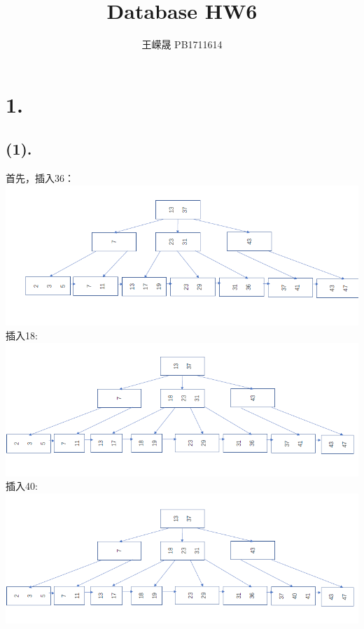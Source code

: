 \documentclass{article}
\title{Database HW6}
\author{王嵘晟 \quad PB1711614}
\date{}
\begin{document}
	\maketitle
	\section*{1.}
	\subsection*{(1).}
	首先，插入36： \\
	\includegraphics[scale=0.48]{2.png}\\
	插入18: \\
	\includegraphics[scale=0.48]{3.png}\\
	插入40: \\
	\includegraphics[scale=0.48]{4.png}\\
\end{document}
